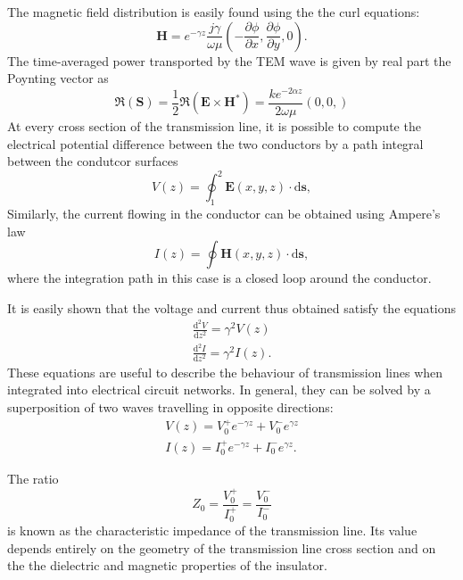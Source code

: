 The magnetic field distribution
is easily found using the the curl equations:
\begin{equation}
		\mathbf{H}=e^{-\gamma z} \frac{j \gamma}{\omega\mu} \left(-\frac{\partial\phi}{\partial x}, \frac{\partial\phi}{\partial y},0\right).
\end{equation}
%
The time-averaged power transported by the TEM wave is given by real part the 
Poynting vector as
\begin{equation}
	\Re(\mathbf{S})=\frac{1}{2}\Re(\mathbf{E}\times\mathbf{H}^\ast) = \frac{k e^{-2\alpha z}}{2\omega\mu} (0,0,)
\end{equation}
At every cross section of
the transmission line, it is possible to compute the electrical
potential difference between the two conductors by a path integral 
between the condutcor surfaces
%
\begin{equation}
V(z) = \oint_1^2 \mathbf{E}(x,y,z)\cdot \mathrm{d}\mathbf{s},
\end{equation}
%
Similarly, the current flowing in the conductor can be obtained using
Ampere's law
%
\begin{equation}
I(z) = \oint \mathbf{H}(x,y,z)\cdot \mathrm{d}\mathbf{s},
\end{equation}
%
where the integration path in this case is a closed loop around the
conductor. 


It is easily shown that the voltage and current thus obtained
satisfy the equations
%
\begin{eqnarray}
\frac{\mathrm{d}^2 V}{\mathrm{d}z^2} = \gamma^2 V(z) \\
\frac{\mathrm{d}^2 I}{\mathrm{d}z^2} = \gamma^2 I(z).
\end{eqnarray}
%
These equations are useful to describe the behaviour of transmission
lines when integrated into electrical circuit networks. In general, they
can be solved by a superposition of two waves travelling in opposite
directions:
%
\begin{eqnarray}
V(z) = V_0^+ e^{-\gamma z} + V_0^- e^{\gamma z} \\ 
I(z) = I_0^+ e^{-\gamma z} + I_0^- e^{\gamma z}.
\end{eqnarray}

The ratio
%
\begin{equation}
Z_0 = \frac{V_0^+}{I_0^+} = \frac{V_0^-}{I_0^-}
\end{equation}
%
is known as the characteristic impedance of the transmission line. Its
value depends entirely on the geometry of the transmission line cross
section and on the the dielectric and magnetic properties of the
insulator.



